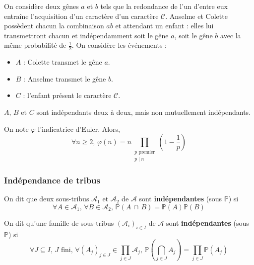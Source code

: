   \begin{example}
    On considère deux gênes $a$ et $b$ tels que la redondance de l'un d'entre eux entraîne l'acquisition d'un caractère d'un caractère $\mathcal{C}$. Anselme et Colette possèdent chacun la combinaison $ab$ et attendant un enfant : elles lui transmettront chacun et indépendamment soit le gêne $a$, soit le gêne $b$ avec la même probabilité de $\frac{1}{2}$. On considère les événements :
    \begin{itemize}
      \item $A$ : Colette transmet le gêne $a$.
      \item $B$ : Anselme transmet le gêne $b$.
      \item $C$ : l'enfant présent le caractère $\mathcal{C}$.
    \end{itemize}
    $A$, $B$ et $C$ sont indépendants deux à deux, mais non mutuellement indépendants.
  \end{example}

  \begin{application}
    On note $\varphi$ l'indicatrice d'Euler. Alors,
    \[ \forall n \geq 2, \, \varphi(n) = n \prod_{\substack{p \text{ premier} \\ p \mid n}} \left( 1 - \frac{1}{p} \right) \]
  \end{application}

  \subsubsection{Indépendance de tribus}


  \begin{definition}
    On dit que deux sous-tribus $\mathcal{A}_1$ et $\mathcal{A}_2$ de $\mathcal{A}$ sont \textbf{indépendantes} (sous $\mathbb{P}$) si
    \[ \forall A \in \mathcal{A}_1, \, \forall B \in \mathcal{A}_2, \, \mathbb{P}(A \, \cap \, B) = \mathbb{P}(A) \mathbb{P}(B) \]
  \end{definition}

  \begin{definition}
    On dit qu'une famille de sous-tribus $(\mathcal{A}_i)_{i \in I}$ de $\mathcal{A}$ sont \textbf{indépendantes} (sous $\mathbb{P}$) si
    \[ \forall J \subseteq I, \, J \text{ fini}, \, \forall (A_j)_{j \in J} \in \prod_{j \in J} \mathcal{A}_j, \, \mathbb{P}\left( \bigcap_{j \in J} A_j \right) = \prod_{j \in J} \mathbb{P}(A_j) \]
  \end{definition}

